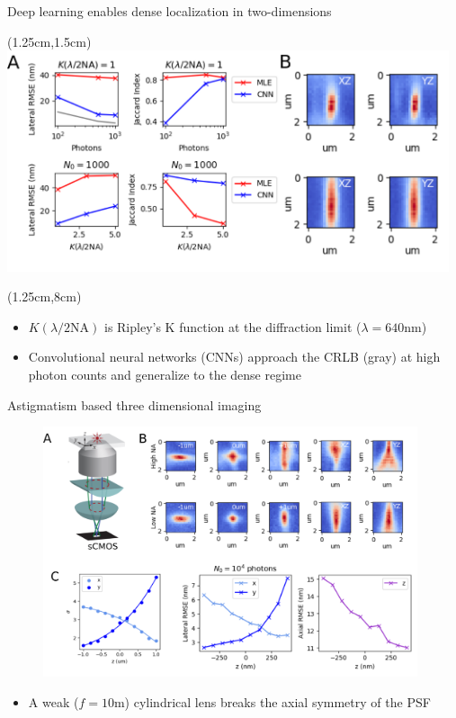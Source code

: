 \documentclass{beamer}					%
\begin{document}
\begin{frame}{Deep learning enables dense localization in two-dimensions}
\begin{textblock*}{13cm}(1.25cm,1.5cm)
\includegraphics[width=13cm]{PSF2D.png}
\end{textblock*}
\begin{textblock*}{13cm}(1.25cm,8cm)
\begin{itemize}
\item $K(\lambda/2\mathrm{NA})$ is Ripley's K function at the diffraction limit ($\lambda=640\mathrm{nm}$)
\item Convolutional neural networks (CNNs) approach the CRLB (gray) at high photon counts and generalize to the dense regime
\end{itemize}
\end{textblock*}

\end{frame}


\begin{frame}{Astigmatism based three dimensional imaging}
\begin{figure}
\includegraphics[width=11cm]{Astigmatism.png}
\end{figure}
\begin{itemize}
\item A weak ($f=10$m) cylindrical lens breaks the axial symmetry of the PSF
\end{itemize}
\end{frame}
\end{document}
